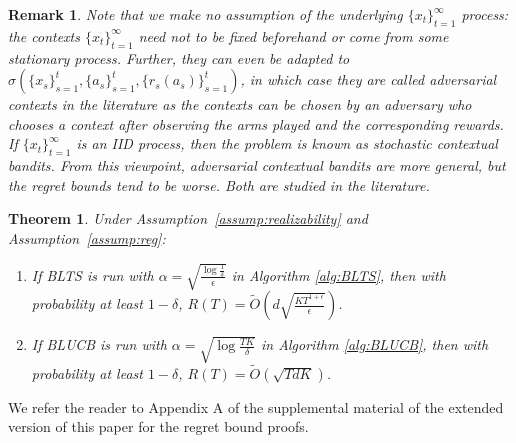 \documentclass[letterpaper]{article} %
\newtheorem{theorem}{Theorem}
\newtheorem{remark}{Remark}
\begin{document}
\begin{remark}
Note that we make no assumption of the underlying $\{x_t\}_{t=1}^{\infty}$ process:
the contexts $\{x_t\}_{t=1}^{\infty}$ need not to be fixed beforehand or come from some stationary process. Further, they can even be adapted to
$\sigma(\{x_s\}_{s=1}^t, \{a_s\}_{s=1}^t, \{r_s(a_s)\}_{s=1}^t)$, in which case they are called adversarial contexts in the literature as the contexts can be chosen by an adversary who chooses a context after observing the arms played and the corresponding rewards.
If $\{x_t\}_{t=1}^{\infty}$ is an IID process, then the problem is known as stochastic contextual bandits. From this viewpoint, adversarial contextual bandits are more general, but the regret bounds tend to be worse. Both are studied in the literature.
\end{remark}

\begin{theorem}\label{thm:main}
Under Assumption~\ref{assump:realizability} and Assumption~\ref{assump:reg}:
\begin{enumerate}
\item
If BLTS is run with $\alpha = \sqrt{\frac{\log\frac{1}{\delta}}{\epsilon}}$ in Algorithm \ref{alg:BLTS},
then with probability at least $1 - \delta$,
$R(T) = \tilde{O}\left(d\sqrt{\frac{KT^{1+\epsilon}}{\epsilon}}\right)$.
\item If BLUCB is run with $\alpha = \sqrt{\log \frac{TK}{\delta}}$ in Algorithm \ref{alg:BLUCB},
then with probability at least $1 - \delta$,
$R(T) = \tilde{O}\left(\sqrt{TdK}\right)$.
\end{enumerate}
\end{theorem}
\noindent We refer the reader to Appendix A of the supplemental material of the extended version of this paper \cite{dimakopoulou2017estimation} for the regret bound proofs.
\end{document}
